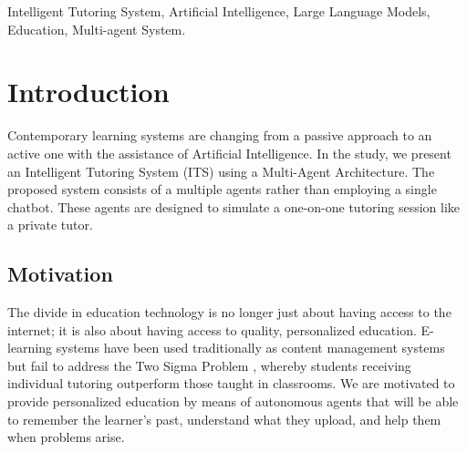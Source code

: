 \documentclass[conference]{IEEEtran}
\begin{document}
\begin{abstract}
Due to the rapid evolution of AI and LLMs, there is a rising necessity to create highly adaptive and intelligent systems, which can not only respond to user requests but also engage them in proactive and personalized way. Traditionally, AI systems use single model solutions. Such systems provide static response options, have very limited ability to adapt, do not
remember any specifics about the user over time. All these factors limit the effectiveness of AI in situations requiring prolonged interaction, personalization and smart decisions.

In this review, we propose creating a proactive multi-agent orchestration solution based on LLMs to engage users in intelligent context-aware communication. This solution will involve several special-purpose agents, including conversational, analytic, recommendation and evaluation agents. They will be part of a system designed to perform specific tasks and then communicate through an orchestration layer, allowing to implement dynamic task management and coordination. An important component of the system will be the user profiling process, which involves capturing user preferences and behavioral characteristics that can be used for providing personalized response options. Our solution will allow proactively initiating interaction with the user, analyzing generated content, such as documents and text data, among others.
\end{abstract}

\begin{IEEEkeywords}
Intelligent Tutoring System, Artificial Intelligence, Large Language Models, Education, Multi-agent System.
\end{IEEEkeywords}

\section{Introduction}
Contemporary learning systems are changing from a passive approach to an active one with the assistance of Artificial Intelligence. In the study, we present an Intelligent Tutoring System (ITS) using a Multi-Agent Architecture. The proposed system consists of a multiple agents rather than employing a single chatbot. These agents are designed to simulate a one-on-one tutoring session like a private tutor.

\subsection{Motivation}
The divide in education technology is no longer just about having access to the internet; it is also about having access to quality, personalized education. E-learning systems have been used traditionally as content management systems but fail to address the Two Sigma Problem \cite{bloom1984}, whereby students receiving individual tutoring outperform those taught in classrooms. We are motivated to provide personalized education by means of autonomous agents that will be able to remember the learner’s past, understand what they upload, and help them when problems arise.
\end{document}

